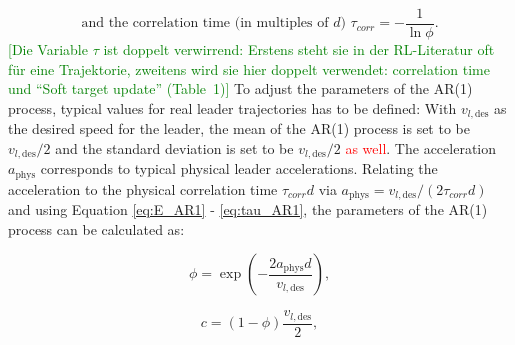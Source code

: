 \documentclass[review]{elsarticle}
\providecommand{\red}[1]{\textcolor{red}{#1}}
\providecommand{\green}[1]{\textcolor{green}{#1}}
\providecommand{\martin}[1]{\red{#1}} %
\providecommand{\martinc}[1]{\green{[#1]}} %
\providecommand{\sub}[1]{_{\mathrm{#1}}}  %
\providecommand{\3}{{\ss}}
\begin{document}
\begin{equation}
\label{eq:tau_AR1}
\text{and the correlation time (in multiples of $d$) }\tau_{corr} = -\frac{1}{\ln \phi}. 
\end{equation}
 \martinc{Die Variable $\tau$ ist doppelt verwirrend: Erstens steht sie
   in der RL-Literatur oft f\"ur eine Trajektorie, zweitens wird sie
   hier doppelt verwendet: correlation time und ``Soft target update'' (Table~1)}
To adjust the parameters of the AR(1) process, typical values for real
leader trajectories has to be defined: With $v_{l,\text{des}}$ as the
desired speed for the leader, the mean of the AR(1) process is set to
be $v_{l,\text{des}}/2$ and the standard deviation is set to be
$v_{l,\text{des}}/2$ \martin{as well}. The acceleration $a\sub{phys}$ corresponds to
typical physical leader accelerations. Relating the acceleration to
the physical correlation time $\tau_{corr} d$ via 
$a\sub{phys}=v_{l,\text{des}}/(2\tau_{corr} d)$  and using Equation \eqref{eq:E_AR1} - \eqref{eq:tau_AR1}, the parameters of the AR(1) process can be calculated as:

\begin{equation}
\phi = \exp\left(-\frac{2a\sub{phys}d}{v_{l,\text{des}}}\right),
\end{equation}

\begin{equation}
c=(1-\phi)\frac{v_{l,\text{des}}}{2},
\end{equation}
\end{document}
